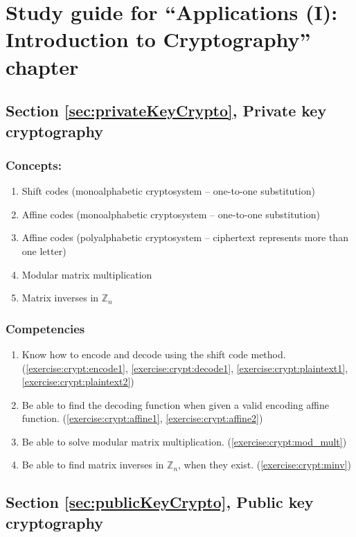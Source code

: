 \section{Study guide  for ``Applications (I): Introduction to Cryptography''  chapter}
\label{sec:crypt:study} 
\subsection*{Section \ref{sec:privateKeyCrypto}, Private key cryptography}
\subsubsection*{Concepts:}
\begin{enumerate}
\item 
Shift codes (monoalphabetic cryptosystem -- one-to-one substitution)
\item
Affine codes (monoalphabetic cryptosystem -- one-to-one substitution)
\item
Affine codes (polyalphabetic cryptosystem -- ciphertext represents more than one letter)
\item
Modular matrix multiplication
\item
Matrix inverses in ${\mathbb Z}_{n}$
\end{enumerate}

\subsubsection*{Competencies}
\begin{enumerate}
\item
Know how to encode and decode using the shift code method.   (\ref{exercise:crypt:encode1}, \ref{exercise:crypt:decode1}, \ref{exercise:crypt:plaintext1}, \ref{exercise:crypt:plaintext2})
\item
Be able to find the decoding function when given a valid encoding affine function.  (\ref{exercise:crypt:affine1}, \ref{exercise:crypt:affine2})
\item
Be able to solve modular matrix multiplication.  (\ref{exercise:crypt:mod_mult})
\item
Be able to find matrix inverses in ${\mathbb Z}_{n}$, when they exist.  (\ref{exercise:crypt:minv})
\end{enumerate}


\subsection*{Section \ref{sec:publicKeyCrypto}, Public key cryptography}
